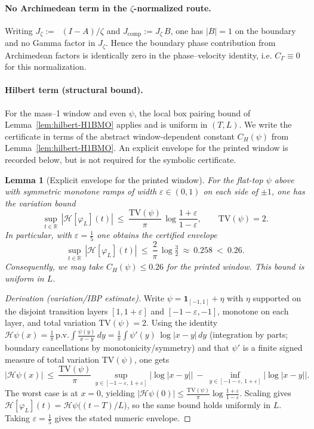 \documentclass[11pt]{article}
\newtheorem{lemma}[theorem]{Lemma}
\theoremstyle{definition}
\theoremstyle{remark}
\newcommand{\R}{\mathbb{R}}
\DeclareMathOperator{\dettwo}{det_2}
\begin{document}
\paragraph{No Archimedean term in the \(\zeta\)-normalized route.}
Writing \(J_\zeta:=\dettwo(I-A)/\zeta\) and \(J_{\mathrm{comp}}:=J_\zeta\,B\), one has \(|B|=1\) on the boundary and no Gamma factor in \(J_\zeta\). Hence the boundary phase contribution from Archimedean factors is identically zero in the phase–velocity identity, i.e. \(C_\Gamma\equiv 0\) for this normalization.

\paragraph{Hilbert term (structural bound).}
For the mass--1 window and even \(\psi\), the local box pairing bound of Lemma~\ref{lem:hilbert-H1BMO} applies and is uniform in \((T,L)\). We write the certificate in terms of the abstract window-dependent constant \(C_H(\psi)\) from Lemma~\ref{lem:hilbert-H1BMO}. An explicit envelope for the printed window is recorded below, but is not required for the symbolic certificate.
\begin{lemma}[Explicit envelope for the printed window]\label{lem:CH-explicit}
For the flat-top \(\psi\) above with symmetric monotone ramps of width \(\varepsilon\in(0,1)\) on each side of \(\pm1\), one has the variation bound
\[
  \sup_{t\in\R}\,|\mathcal H[\varphi_L](t)|\ \le\ \frac{\mathrm{TV}(\psi)}{\pi}\,\log\frac{1+\varepsilon}{1-\varepsilon},\qquad \mathrm{TV}(\psi)=2.
\]
In particular, with \(\varepsilon=\tfrac15\) one obtains the certified envelope
\[
  \sup_{t\in\R}\,|\mathcal H[\varphi_L](t)|\ \le\ \frac{2}{\pi}\,\log\tfrac{3}{2}\ \approx\ 0.258\ <\ 0.26.
\]
Consequently, we may take \(C_H(\psi)\le 0.26\) for the printed window. This bound is uniform in \(L\).
\end{lemma}
\begin{proof}[Derivation (variation/IBP estimate)]
Write \(\psi=\mathbf 1_{[-1,1]}+\eta\) with \(\eta\) supported on the disjoint transition layers \([1,1+\varepsilon]\) and \([-1-\varepsilon,-1]\), monotone on each layer, and total variation \(\mathrm{TV}(\psi)=2\). Using the identity \(\mathcal H\psi(x)=\tfrac{1}{\pi}\,\mathrm{p.v.}\int \tfrac{\psi(y)}{x-y}\,dy=\tfrac{1}{\pi}\int \psi'(y)\,\log|x-y|\,dy\) (integration by parts; boundary cancellations by monotonicity/symmetry) and that \(\psi'\) is a finite signed measure of total variation \(\mathrm{TV}(\psi)\), one gets
\[
  |\mathcal H\psi(x)|\ \le\ \frac{\mathrm{TV}(\psi)}{\pi}\,\sup_{y\in[-1-\varepsilon,\,1+\varepsilon]}\big|\log|x-y|\big|\ -\ \inf_{y\in[-1-\varepsilon,\,1+\varepsilon]}\big|\log|x-y|\big|.
\]
The worst case is at \(x=0\), yielding \(|\mathcal H\psi(0)|\le \tfrac{\mathrm{TV}(\psi)}{\pi}\log\tfrac{1+\varepsilon}{1-\varepsilon}\). Scaling gives \(\mathcal H[\varphi_L](t)=\mathcal H\psi\big((t-T)/L\big)\), so the same bound holds uniformly in \(L\). Taking \(\varepsilon=\tfrac15\) gives the stated numeric envelope.
\end{proof}
\end{document}
